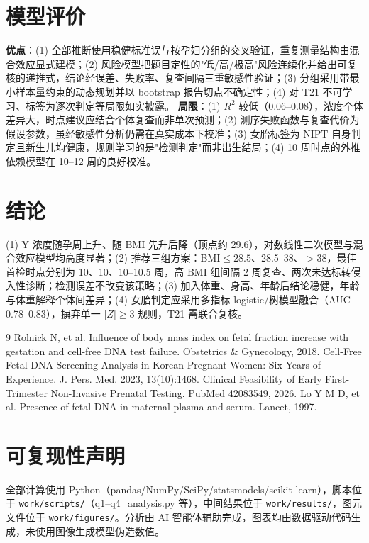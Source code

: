 \documentclass[UTF8,a4paper,11pt]{ctexart}
\begin{document}
\section{模型评价}
\textbf{优点}：(1) 全部推断使用稳健标准误与按孕妇分组的交叉验证，重复测量结构由混合效应显式建模；(2) 风险模型把题目定性的"低/高/极高"风险连续化并给出可复核的递推式，结论经误差、失败率、复查间隔三重敏感性验证；(3) 分组采用带最小样本量约束的动态规划并以 bootstrap 报告切点不确定性；(4) 对 T21 不可学习、标签为逐次判定等局限如实披露。
\textbf{局限}：(1) $R^2$ 较低（0.06--0.08），浓度个体差异大，时点建议应结合个体复查而非单次预测；(2) 测序失败函数与复查代价为假设参数，虽经敏感性分析仍需在真实成本下校准；(3) 女胎标签为 NIPT 自身判定且新生儿均健康，规则学习的是"检测判定"而非出生结局；(4) 10 周时点的外推依赖模型在 10--12 周的良好校准。

\section{结论}
(1) Y 浓度随孕周上升、随 BMI 先升后降（顶点约 29.6），对数线性二次模型与混合效应模型均高度显著；(2) 推荐三组方案：BMI$\le28.5$、28.5--38、$>38$，最佳首检时点分别为 10、10、10--10.5 周，高 BMI 组间隔 2 周复查、两次未达标转侵入性诊断；检测误差不改变该策略；(3) 加入体重、身高、年龄后结论稳健，年龄与体重解释个体间差异；(4) 女胎判定应采用多指标 logistic/树模型融合（AUC 0.78--0.83），摒弃单一 $|Z|\ge3$ 规则，T21 需联合复核。

\begin{thebibliography}{9}
 Rolnick N, et al. Influence of body mass index on fetal fraction increase with gestation and cell-free DNA test failure. Obstetrics \& Gynecology, 2018.
 Cell-Free Fetal DNA Screening Analysis in Korean Pregnant Women: Six Years of Experience. J. Pers. Med. 2023, 13(10):1468.
 Clinical Feasibility of Early First-Trimester Non-Invasive Prenatal Testing. PubMed 42083549, 2026.
 Lo Y M D, et al. Presence of fetal DNA in maternal plasma and serum. Lancet, 1997.
\end{thebibliography}

\appendix
\section{可复现性声明}
全部计算使用 Python（pandas/NumPy/SciPy/statsmodels/scikit-learn），脚本位于 \texttt{work/scripts/}（q1--q4\_analysis.py 等），中间结果位于 \texttt{work/results/}，图元文件位于 \texttt{work/figures/}。分析由 AI 智能体辅助完成，图表均由数据驱动代码生成，未使用图像生成模型伪造数值。
\end{document}
